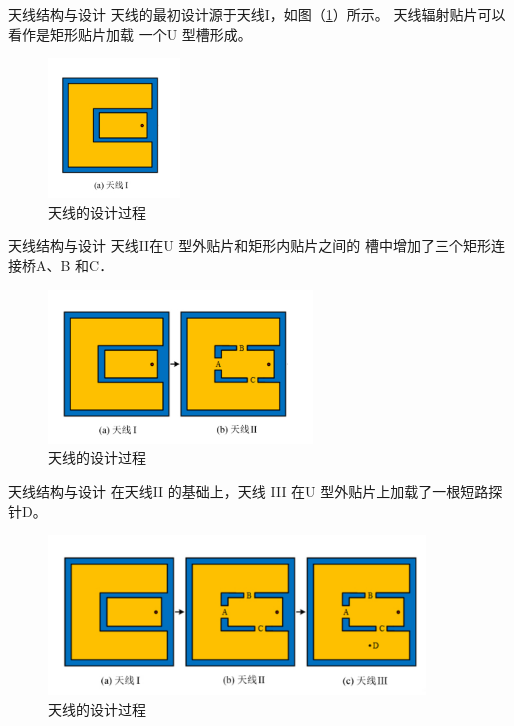 \documentclass[10pt]{beamer}
\begin{document}
\begin{frame}{天线结构与设计}
	\qquad 天线的最初设计源于天线I，如图（\ref{ff16}）所示。
	天线辐射贴片可以看作是矩形贴片加载
	一个U 型槽形成。 
	\begin{figure}[htbp]
		\centering
		\includegraphics[width=3.5cm]{figs/16.png}
		\caption{天线的设计过程}
		\label{ff16}
	\end{figure}
	 
	
\end{frame}
\begin{frame}{天线结构与设计}
\qquad 天线II在U 型外贴片和矩形内贴片之间的
	槽中增加了三个矩形连接桥A、B 和C．

	\begin{figure}[htbp]
		\centering
		\includegraphics[width=7cm]{figs/17.png}
		\caption{天线的设计过程}
		\label{3}
	\end{figure}
\end{frame}


\begin{frame}{天线结构与设计}
	\qquad 在天线II 的基础上，天线
	III 在U 型外贴片上加载了一根短路探针D。
		\begin{figure}[htbp]
			\centering
			\includegraphics[width=10cm]{figs/3.png}
			\caption{天线的设计过程}
			\label{3}
		\end{figure}
		
	\end{frame}
\end{document}
